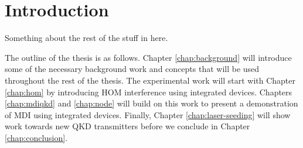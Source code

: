 %
%
\graphicspath{{./chapters/chapter01/fig01/}}

\let\textcircled=\pgftextcircled
\chapter{Introduction}
\label{chap:intro}
\glsresetall


Something about the rest of the stuff in here.

\lipsum[1-7]
\lipsum[1-7]

The outline of the thesis is as follows. Chapter \ref{chap:background} will introduce some of the necessary background work and concepts that will be used throughout the rest of the thesis. The experimental work will start with Chapter \ref{chap:hom} by introducing \ac{HOM} interference using integrated devices. Chapters \ref{chap:mdiqkd} and \ref{chap:node} will build on this work to present a demonstration of \ac{MDI} using integrated devices. Finally, Chapter \ref{chap:laser-seeding} will show work towards new \ac{QKD} transmitters before we conclude in Chapter \ref{chap:conclusion}.

